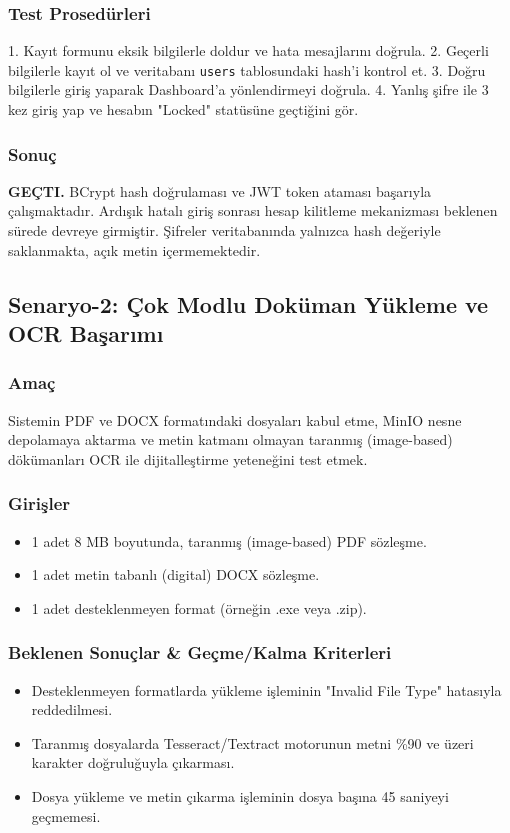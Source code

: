 \documentclass[12pt,a4paper]{article}
\begin{document}
\subsubsection{Test Prosedürleri}
1. Kayıt formunu eksik bilgilerle doldur ve hata mesajlarını doğrula.
2. Geçerli bilgilerle kayıt ol ve veritabanı \texttt{users} tablosundaki hash'i kontrol et.
3. Doğru bilgilerle giriş yaparak Dashboard'a yönlendirmeyi doğrula.
4. Yanlış şifre ile 3 kez giriş yap ve hesabın "Locked" statüsüne geçtiğini gör.

\subsubsection{Sonuç}
\textbf{GEÇTI.} BCrypt hash doğrulaması ve JWT token ataması başarıyla çalışmaktadır. Ardışık hatalı giriş sonrası hesap kilitleme mekanizması beklenen sürede devreye girmiştir. Şifreler veritabanında yalnızca hash değeriyle saklanmakta, açık metin içermemektedir.

\subsection{Senaryo-2: Çok Modlu Doküman Yükleme ve OCR Başarımı}
\subsubsection{Amaç}
Sistemin PDF ve DOCX formatındaki dosyaları kabul etme, MinIO nesne depolamaya aktarma ve metin katmanı olmayan taranmış (image-based) dökümanları OCR ile dijitalleştirme yeteneğini test etmek.

\subsubsection{Girişler}
\begin{itemize}
    \item 1 adet 8 MB boyutunda, taranmış (image-based) PDF sözleşme.
    \item 1 adet metin tabanlı (digital) DOCX sözleşme.
    \item 1 adet desteklenmeyen format (örneğin .exe veya .zip).
\end{itemize}

\subsubsection{Beklenen Sonuçlar \& Geçme/Kalma Kriterleri}
\begin{itemize}
    \item Desteklenmeyen formatlarda yükleme işleminin "Invalid File Type" hatasıyla reddedilmesi.
    \item Taranmış dosyalarda Tesseract/Textract motorunun metni \%90 ve üzeri karakter doğruluğuyla çıkarması.
    \item Dosya yükleme ve metin çıkarma işleminin dosya başına 45 saniyeyi geçmemesi.
\end{itemize}
\end{document}
